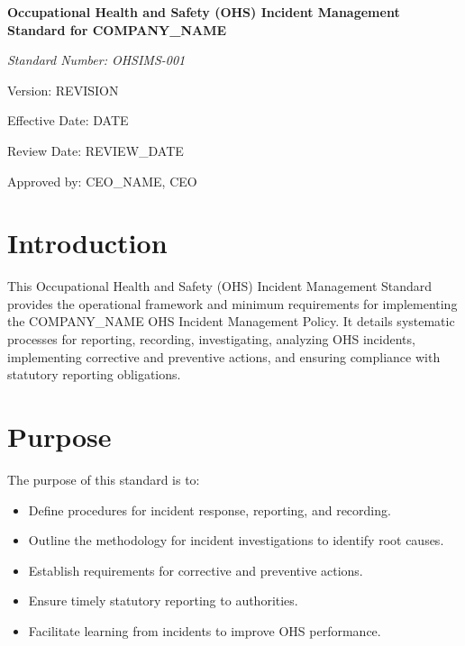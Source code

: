 \documentclass[12pt]{article}
\begin{document}
\begin{titlepage}
    \centering
    \vspace*{2cm}
    {\LARGE\bfseries Occupational Health and Safety (OHS) Incident Management Standard for {{COMPANY_NAME}}\par}
    \vspace{1cm}
    {\large\itshape Standard Number: OHSIMS-001\par}
    \vspace{0.5cm}
    {\normalsize Version: {{REVISION}}\par}
    \vspace{0.5cm}
    {\normalsize Effective Date: {{DATE}}\par}
    \vspace{0.5cm}
    {\normalsize Review Date: {{REVIEW_DATE}}\par}
    \vspace{2cm}
    {\normalsize Approved by: {{CEO_NAME}}, CEO\par}
\end{titlepage}

\section{Introduction}
This Occupational Health and Safety (OHS) Incident Management Standard provides the operational framework and minimum requirements for implementing the {{COMPANY_NAME}} OHS Incident Management Policy. It details systematic processes for reporting, recording, investigating, analyzing OHS incidents, implementing corrective and preventive actions, and ensuring compliance with statutory reporting obligations.

\section{Purpose}
The purpose of this standard is to:
\begin{itemize}
    \item Define procedures for incident response, reporting, and recording.
    \item Outline the methodology for incident investigations to identify root causes.
    \item Establish requirements for corrective and preventive actions.
    \item Ensure timely statutory reporting to authorities.
    \item Facilitate learning from incidents to improve OHS performance.
\end{itemize}
\end{document}
